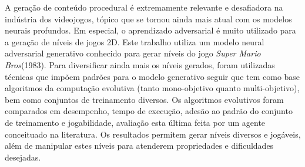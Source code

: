 \begin{resumo}



A geração de conteúdo procedural é extremamente relevante e desafiadora na indústria dos videojogos, tópico que se tornou ainda mais atual com os modelos neurais profundos. Em especial, o aprendizado adversarial é muito utilizado para a geração de níveis de jogos 2D. Este trabalho utiliza um modelo neural adversarial generativo conhecido para gerar níveis do jogo \textit{Super Mario Bros}(1983). Para diversificar ainda mais os níveis gerados, foram utilizadas técnicas que impõem padrões para o modelo generativo seguir que tem como base algoritmos da computação evolutiva (tanto mono-objetivo quanto multi-objetivo), bem como conjuntos de treinamento diversos. Os algoritmos evolutivos foram comparados em desempenho, tempo de execução, adesão ao padrão do conjunto de treinamento e jogabilidade, avaliação esta última feita por um agente conceituado na literatura. Os resultados permitem gerar níveis diversos e jogáveis, além de manipular estes níveis para atenderem propriedades e dificuldades desejadas.

\end{resumo}

